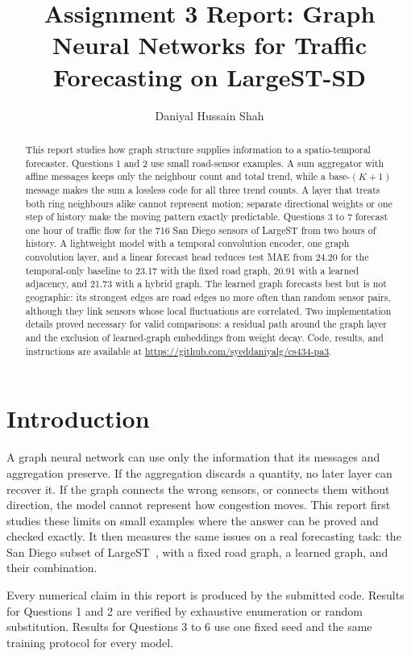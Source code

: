 \documentclass{article}
\title{Assignment 3 Report: Graph Neural Networks for Traffic Forecasting on LargeST-SD}
\author{
  Daniyal Hussain Shah
}
\begin{document}
\maketitle

\begin{abstract}
This report studies how graph structure supplies information to a spatio-temporal forecaster. Questions 1 and 2 use small road-sensor examples. A sum aggregator with affine messages keeps only the neighbour count and total trend, while a base-$(K{+}1)$ message makes the sum a lossless code for all three trend counts. A layer that treats both ring neighbours alike cannot represent motion; separate directional weights or one step of history make the moving pattern exactly predictable. Questions 3 to 7 forecast one hour of traffic flow for the 716 San Diego sensors of LargeST from two hours of history. A lightweight model with a temporal convolution encoder, one graph convolution layer, and a linear forecast head reduces test MAE from 24.20 for the temporal-only baseline to 23.17 with the fixed road graph, 20.91 with a learned adjacency, and 21.73 with a hybrid graph. The learned graph forecasts best but is not geographic: its strongest edges are road edges no more often than random sensor pairs, although they link sensors whose local fluctuations are correlated. Two implementation details proved necessary for valid comparisons: a residual path around the graph layer and the exclusion of learned-graph embeddings from weight decay. Code, results, and instructions are available at \url{https://github.com/syeddaniyalg/cs434-pa3}.
\end{abstract}

\section{Introduction}

A graph neural network can use only the information that its messages and aggregation preserve. If the aggregation discards a quantity, no later layer can recover it. If the graph connects the wrong sensors, or connects them without direction, the model cannot represent how congestion moves. This report first studies these limits on small examples where the answer can be proved and checked exactly. It then measures the same issues on a real forecasting task: the San Diego subset of LargeST~\citep{liu2023largest}, with a fixed road graph, a learned graph, and their combination.

Every numerical claim in this report is produced by the submitted code. Results for Questions 1 and 2 are verified by exhaustive enumeration or random substitution. Results for Questions 3 to 6 use one fixed seed and the same training protocol for every model.
\end{document}
